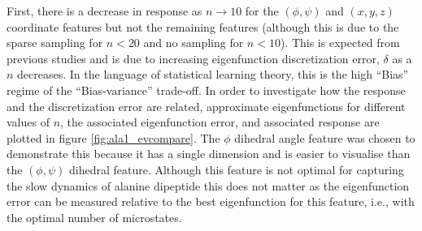 First, there is a decrease in response as $n \rightarrow 10$ for the $(\phi, \psi)$ and $(x,y,z)$ coordinate features but not the remaining features (although this is due to the sparse sampling for $n<20$ and no sampling for $n<10$). This is expected from previous studies\cite{wuVariationalApproachLearning2020c,mcgibbonVariationalCrossvalidationSlow2015} and is due to increasing eigenfunction discretization error, $\delta$\cite{prinzMarkovModelsMolecular2011} as a $n$ decreases. In the language of statistical learning theory\cite{friedman2001elements}, this is the high ``Bias'' regime of the ``Bias-variance'' trade-off.  In order to investigate how the response and the discretization error  are related,  approximate eigenfunctions for different values of $n$, the associated eigenfunction error, and associated response are plotted in figure \ref{fig:ala1_evcompare}. The $\phi$ dihedral angle feature was chosen to demonstrate this because it has a single dimension and is easier to visualise than the $(\phi, \psi)$ dihedral feature. Although this feature is not optimal for capturing the slow dynamics of alanine dipeptide this does not matter as the eigenfunction error can be measured relative to the best eigenfunction for this feature, i.e., with the optimal number of microstates. 

